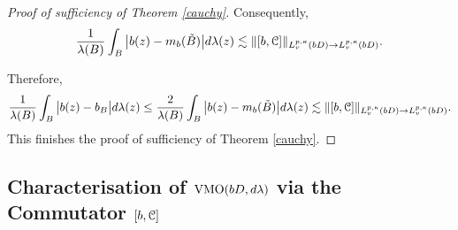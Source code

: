 \documentclass[11pt,a4paper]{amsart}
\numberwithin{equation}{section}
\begin{document}
{\begin{proof}[Proof of sufficiency of Theorem \ref{cauchy}]
Consequently,
\begin{align*}
{1\over \lambda(B)}\int_{B}\big|b(z)-m_b(\tilde B)\big|d\lambda(z)\lesssim
 \|[b, \EuScript C]\|_{L_v^{p,\kappa}(bD)\to L_v^{p,\kappa}(bD)}.
\end{align*}

Therefore,
\begin{align*}%
{1\over \lambda(B)}\int_{B}\big|b(z)-b_B\big|d\lambda(z)
\leq {2\over \lambda(B)}\int_{B}\big|b(z)-m_b(\tilde B)\big|d\lambda(z)
\lesssim   \|[b, \EuScript C]\|_{L_v^{p,\kappa}(bD)\to L_v^{p,\kappa}(bD)}.
\end{align*}
This finishes the proof of sufficiency of Theorem \ref{cauchy}.
\end{proof}








\subsection{Characterisation of ${\rm VMO}(bD,d\lambda)$ via the Commutator $[b, \EuScript C]$}





}
\end{document}
